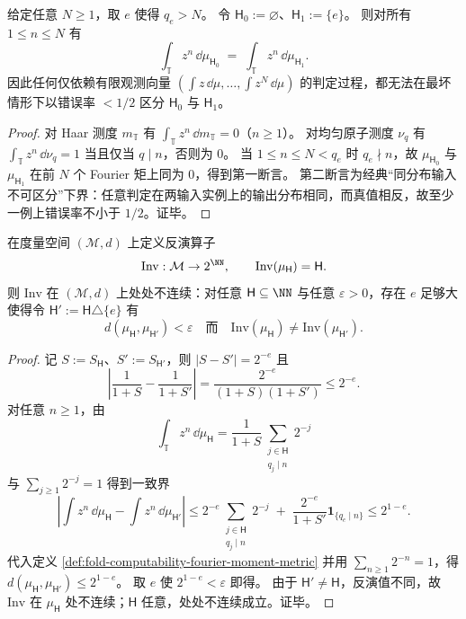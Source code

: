 \begin{proposition}\label{prop:fold-computability-halting-spectrum-finite-fourier-window-blindspot}
给定任意 \(N\ge 1\)，取 \(e\) 使得 \(q_e>N\)。
令 \(\mathsf H_0:=\varnothing\)、\(\mathsf H_1:=\{e\}\)。
则对所有 \(1\le n\le N\) 有
\[
\int_{\mathbb T}z^n\,\dd\mu_{\mathsf H_0}
\;=\;
\int_{\mathbb T}z^n\,\dd\mu_{\mathsf H_1}.
\]
因此任何仅依赖有限观测向量
\(
(\int z\,\dd\mu,\dots,\int z^N\,\dd\mu)
\)
的判定过程，都无法在最坏情形下以错误率 \(<1/2\) 区分 \(\mathsf H_0\) 与 \(\mathsf H_1\)。
\end{proposition}
\begin{proof}
对 Haar 测度 \(m_{\mathbb T}\) 有 \(\int_{\mathbb T}z^n\,\dd m_{\mathbb T}=0\)（\(n\ge 1\)）。
对均匀原子测度 \(\nu_{q}\) 有
\(
\int_{\mathbb T}z^n\,\dd\nu_{q}=1
\)
当且仅当 \(q\mid n\)，否则为 \(0\)。
当 \(1\le n\le N<q_e\) 时 \(q_e\nmid n\)，故 \(\mu_{\mathsf H_0}\) 与 \(\mu_{\mathsf H_1}\) 在前 \(N\) 个 Fourier 矩上同为 \(0\)，得到第一断言。
第二断言为经典“同分布输入不可区分”下界：任意判定在两输入实例上的输出分布相同，而真值相反，故至少一例上错误率不小于 \(1/2\)。证毕。
\end{proof}

\begin{theorem}[停机谱反演算子的处处不连续性]\label{thm:fold-computability-halting-spectrum-inversion-everywhere-discontinuous}
在度量空间 \((\mathcal M,d)\) 上定义反演算子
\[
\mathrm{Inv}:\mathcal M\to 2^{\NN},\qquad
\mathrm{Inv}(\mu_{\mathsf H})=\mathsf H.
\]
则 \(\mathrm{Inv}\) 在 \((\mathcal M,d)\) 上处处不连续：对任意 \(\mathsf H\subseteq\NN\) 与任意 \(\varepsilon>0\)，存在 \(e\) 足够大使得令 \(\mathsf H':=\mathsf H\triangle\{e\}\) 有
\[
d(\mu_{\mathsf H},\mu_{\mathsf H'})<\varepsilon
\quad\text{而}\quad
\mathrm{Inv}(\mu_{\mathsf H})\neq \mathrm{Inv}(\mu_{\mathsf H'}).
\]
\end{theorem}
\begin{proof}
记 \(S:=S_{\mathsf H}\)、\(S':=S_{\mathsf H'}\)，则 \(|S-S'|=2^{-e}\) 且
\[
\left|\frac{1}{1+S}-\frac{1}{1+S'}\right|
=\frac{2^{-e}}{(1+S)(1+S')}\le 2^{-e}.
\]
对任意 \(n\ge 1\)，由
\[
\int_{\mathbb T} z^n\,\dd\mu_{\mathsf H}
=\frac{1}{1+S}\sum_{\substack{j\in\mathsf H\\ q_j\mid n}}2^{-j}
\]
与 \(\sum_{j\ge 1}2^{-j}=1\) 得到一致界
\[
\left|\int z^n\,\dd\mu_{\mathsf H}-\int z^n\,\dd\mu_{\mathsf H'}\right|
\le
2^{-e}\sum_{\substack{j\in\mathsf H\\ q_j\mid n}}2^{-j}
\;+\;
\frac{2^{-e}}{1+S'}\mathbf 1_{\{q_e\mid n\}}
\le 2^{1-e}.
\]
代入定义 \ref{def:fold-computability-fourier-moment-metric} 并用 \(\sum_{n\ge 1}2^{-n}=1\)，得
\(
d(\mu_{\mathsf H},\mu_{\mathsf H'})\le 2^{1-e}
\)。
取 \(e\) 使 \(2^{1-e}<\varepsilon\) 即得。
由于 \(\mathsf H'\neq \mathsf H\)，反演值不同，故 \(\mathrm{Inv}\) 在 \(\mu_{\mathsf H}\) 处不连续；\(\mathsf H\) 任意，处处不连续成立。证毕。
\end{proof}

